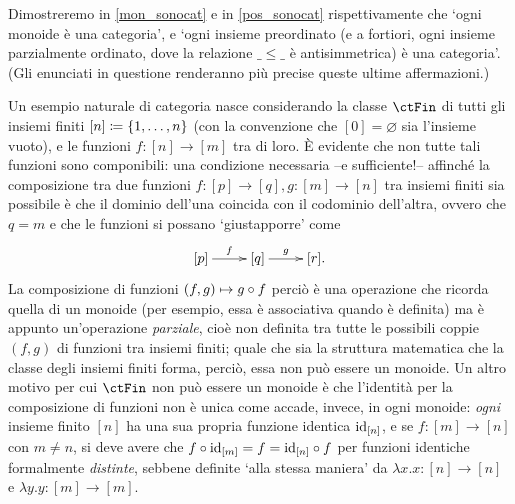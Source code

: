 Dimostreremo in \ref{mon_sonocat} e in \ref{pos_sonocat} rispettivamente che `ogni monoide è una categoria', e `ogni insieme preordinato (e a fortiori, ogni insieme parzialmente ordinato, dove la relazione \(\_\le\_\) è antisimmetrica) è una categoria'. (Gli enunciati in questione renderanno più precise queste ultime affermazioni.)
\begin{example}
	Un esempio naturale di categoria nasce considerando la classe \(\ctFin\) di tutti gli insiemi finiti \([n]\coloneqq \{1,\dots,n\}\) (con la convenzione che \([0]=\varnothing\) sia l'insieme vuoto), e le funzioni \(f : [n] \to [m]\) tra di loro. \`E evidente che non tutte tali funzioni sono componibili: una condizione necessaria --e sufficiente!-- affinché la composizione tra due funzioni \(f : [p] \to [q],g : [m] \to [n]\) tra insiemi finiti sia possibile è che il dominio dell'una coincida con il codominio dell'altra, ovvero che \(q=m\) e che le funzioni si possano `giustapporre' come
	\[\xymatrix{
			[p] \ar[r]^-f & [q] \ar[r]^-g & [r].
		}\]
		La composizione di funzioni \((f,g)\mapsto g\circ f\) perciò è una operazione che ricorda quella di un monoide (per esempio, essa è associativa quando è definita) ma è appunto un'operazione \emph{parziale}, cioè non definita tra tutte le possibili coppie \((f,g)\) di funzioni tra insiemi finiti; quale che sia la struttura matematica che la classe degli insiemi finiti forma, perciò, essa non può essere un monoide. Un altro motivo per cui \(\ctFin\) non può essere un monoide è che l'identità per la composizione di funzioni non è unica come accade, invece, in ogni monoide: \emph{ogni} insieme finito \([n]\) ha una sua propria funzione identica $\mathrm{id}_{[n]}$, e se \(f : [m]\to [n]\) con $m\ne n$, si deve avere che \(f\circ \mathrm{id}_{[m]}=f=\mathrm{id}_{[n]}\circ f\) per funzioni identiche formalmente \emph{distinte}, sebbene definite `alla stessa maniera' da \(\lambda x.x : [n]\to [n]\) e \(\lambda y.y : [m]\to [m]\).


\end{example}
